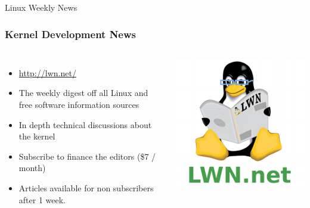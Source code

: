 \begin{frame}
  Linux Weekly News
  \frametitle{Kernel Development News}
  \begin{columns}
    \begin{itemize}
    \item \url{http://lwn.net/}
    \item The weekly digest off all Linux and free software
      information sources
    \item In depth technical discussions about the kernel
    \item Subscribe to finance the editors (\$7 / month)
    \item Articles available for non subscribers after 1 week.
    \end{itemize}
    \includegraphics[width=\textwidth]{slides/kernel-resources-references/lwn.png}
  \end{columns}
\end{frame}

